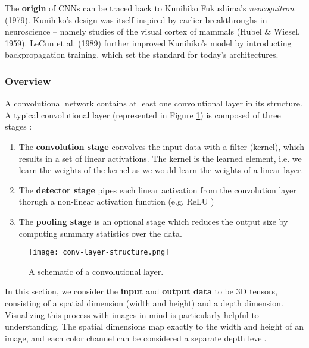The \textbf{origin} of CNNs can be traced back to Kunihiko Fukushima's \emph{neocognitron} (1979).
Kunihiko’s design \cite{neocognitron-paper} was itself inspired by earlier breakthroughs in neuroscience -- namely studies of the visual cortex of mammals (Hubel \& Wiesel, 1959).
LeCun et al. (1989) further improved Kunihiko’s model by introducting backpropagation training, which set the standard for today’s architectures.

\subsubsection{Overview}
A convolutional network contains at least one convolutional layer in its structure.
A typical convolutional layer (represented in Figure \ref{fig:conv-layer}) is composed of three stages \cite{Goodfellow-et-al-2016}:
\begin{enumerate}
    \item The \textbf{convolution stage} convolves the input data with a filter (kernel), which results in a set of linear activations.
    The kernel is the learned element, i.e. we learn the weights of the kernel as we would learn the weights of a linear layer.
    \item The \textbf{detector stage} pipes each linear activation from the convolution layer thorugh a non-linear activation function (e.g. ReLU \footnotemark)
    \item The \textbf{pooling stage} is an optional stage which reduces the output size by computing summary statistics over the data.
\end{enumerate}

\begin{figure}[h]
    \centering
    \texttt{[image: conv-layer-structure.png]}
    \caption{A schematic of a convolutional layer.}
    \label{fig:conv-layer}
\end{figure}

In this section, we consider the \textbf{input} and \textbf{output data} to be 3D tensors, consisting of a spatial dimension (width and height) and a depth dimension.
Visualizing this process with images in mind is particularly helpful to understanding.
The spatial dimensions map exactly to the width and height of an image, and each color channel can be considered a separate depth level.


